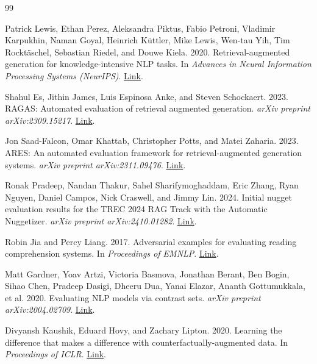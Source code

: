 \documentclass[11pt]{article}
\begin{document}
\begingroup
\small
\begin{thebibliography}{99}

Patrick Lewis, Ethan Perez, Aleksandra Piktus, Fabio Petroni, Vladimir Karpukhin,
Naman Goyal, Heinrich K\"{u}ttler, Mike Lewis, Wen-tau Yih, Tim Rockt\"{a}schel,
Sebastian Riedel, and Douwe Kiela. 2020.
\newblock Retrieval-augmented generation for knowledge-intensive NLP tasks.
\newblock In \emph{Advances in Neural Information Processing Systems (NeurIPS)}.
\newblock \href{https://arxiv.org/abs/2005.11401}{Link}.

Shahul Es, Jithin James, Luis Espinosa Anke, and Steven Schockaert. 2023.
\newblock RAGAS: Automated evaluation of retrieval augmented generation.
\newblock \emph{arXiv preprint arXiv:2309.15217}.
\newblock \href{https://arxiv.org/abs/2309.15217}{Link}.

Jon Saad-Falcon, Omar Khattab, Christopher Potts, and Matei Zaharia. 2023.
\newblock ARES: An automated evaluation framework for retrieval-augmented generation
systems.
\newblock \emph{arXiv preprint arXiv:2311.09476}.
\newblock \href{https://arxiv.org/abs/2311.09476}{Link}.

Ronak Pradeep, Nandan Thakur, Sahel Sharifymoghaddam, Eric Zhang, Ryan Nguyen,
Daniel Campos, Nick Craswell, and Jimmy Lin. 2024.
\newblock Initial nugget evaluation results for the TREC 2024 RAG Track with the
Automatic Nuggetizer.
\newblock \emph{arXiv preprint arXiv:2410.01282}.
\newblock \href{https://arxiv.org/abs/2410.01282}{Link}.

Robin Jia and Percy Liang. 2017.
\newblock Adversarial examples for evaluating reading comprehension systems.
\newblock In \emph{Proceedings of EMNLP}.
\newblock \href{https://aclanthology.org/D17-1215/}{Link}.

Matt Gardner, Yoav Artzi, Victoria Basmova, Jonathan Berant, Ben Bogin, Sihao Chen,
Pradeep Dasigi, Dheeru Dua, Yanai Elazar, Ananth Gottumukkala, et al. 2020.
\newblock Evaluating NLP models via contrast sets.
\newblock \emph{arXiv preprint arXiv:2004.02709}.
\newblock \href{https://arxiv.org/abs/2004.02709}{Link}.

Divyansh Kaushik, Eduard Hovy, and Zachary Lipton. 2020.
\newblock Learning the difference that makes a difference with
counterfactually-augmented data.
\newblock In \emph{Proceedings of ICLR}.
\newblock \href{https://arxiv.org/abs/1909.12434}{Link}.


\end{thebibliography}
\end{document}

